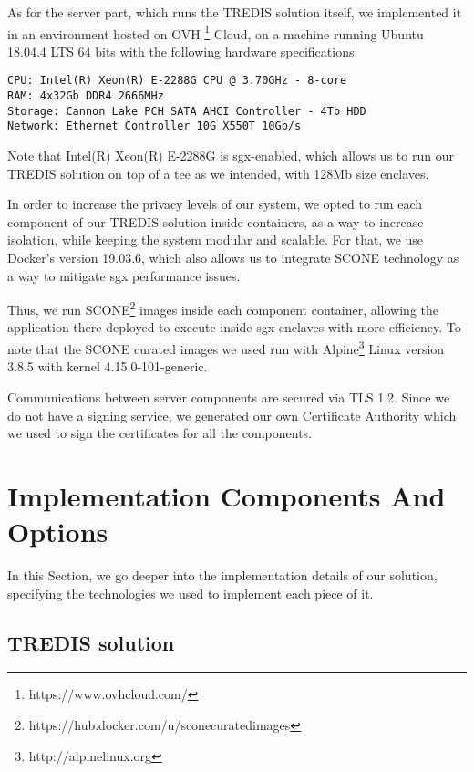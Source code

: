 As for the server part, which runs the TREDIS solution itself, we implemented it in an environment hosted on OVH \footnote{https://www.ovhcloud.com/} Cloud, on a machine running Ubuntu 18.04.4 LTS 64 bits with the following hardware specifications: 
\vspace{5mm}
\begin{lstlisting}
CPU: Intel(R) Xeon(R) E-2288G CPU @ 3.70GHz - 8-core
RAM: 4x32Gb DDR4 2666MHz 
Storage: Cannon Lake PCH SATA AHCI Controller - 4Tb HDD
Network: Ethernet Controller 10G X550T 10Gb/s
\end{lstlisting}
\vspace{3mm}

Note that Intel(R) Xeon(R) E-2288G is \gls{sgx}-enabled, which allows us to run our TREDIS solution on top of a \gls{tee} as we intended, with 128Mb size enclaves. 

In order to increase the privacy levels of our system, we opted to run each component of our TREDIS solution inside containers, as a way to increase isolation, while keeping the system modular and scalable. 
For that, we use Docker's version 19.03.6, which also allows us to integrate SCONE technology as a way to mitigate \gls{sgx} performance issues. 

Thus, we run SCONE\footnote{https://hub.docker.com/u/sconecuratedimages} images  inside each component container, allowing the application there deployed to execute inside \gls{sgx} enclaves with more efficiency. 
To note that the SCONE curated images we used run with Alpine\footnote{http://alpinelinux.org} Linux version 3.8.5 with kernel 4.15.0-101-generic.

Communications between server components are secured via TLS 1.2. Since we do not have a signing service, we generated our own Certificate Authority which we used to sign the certificates for all the components. 



\section{Implementation Components And Options}
\label{sec:implementationComponents}

In this Section, we go deeper into the implementation details of our solution, specifying the technologies we used to implement each piece of it.


\subsection{TREDIS solution}
\label{ssec:TREDIS_impl_components}

